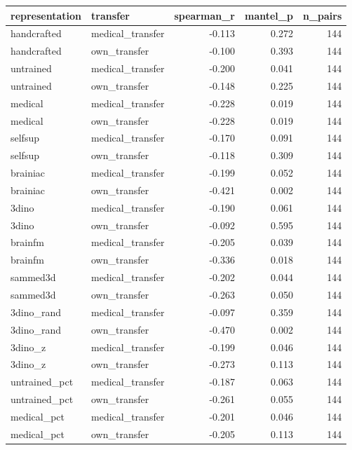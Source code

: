 \begin{tabular}{llrrr}
\toprule
representation & transfer & spearman\_r & mantel\_p & n\_pairs \\
\midrule
handcrafted & medical\_transfer & -0.113 & 0.272 & 144 \\
handcrafted & own\_transfer & -0.100 & 0.393 & 144 \\
untrained & medical\_transfer & -0.200 & 0.041 & 144 \\
untrained & own\_transfer & -0.148 & 0.225 & 144 \\
medical & medical\_transfer & -0.228 & 0.019 & 144 \\
medical & own\_transfer & -0.228 & 0.019 & 144 \\
selfsup & medical\_transfer & -0.170 & 0.091 & 144 \\
selfsup & own\_transfer & -0.118 & 0.309 & 144 \\
brainiac & medical\_transfer & -0.199 & 0.052 & 144 \\
brainiac & own\_transfer & -0.421 & 0.002 & 144 \\
3dino & medical\_transfer & -0.190 & 0.061 & 144 \\
3dino & own\_transfer & -0.092 & 0.595 & 144 \\
brainfm & medical\_transfer & -0.205 & 0.039 & 144 \\
brainfm & own\_transfer & -0.336 & 0.018 & 144 \\
sammed3d & medical\_transfer & -0.202 & 0.044 & 144 \\
sammed3d & own\_transfer & -0.263 & 0.050 & 144 \\
3dino\_rand & medical\_transfer & -0.097 & 0.359 & 144 \\
3dino\_rand & own\_transfer & -0.470 & 0.002 & 144 \\
3dino\_z & medical\_transfer & -0.199 & 0.046 & 144 \\
3dino\_z & own\_transfer & -0.273 & 0.113 & 144 \\
untrained\_pct & medical\_transfer & -0.187 & 0.063 & 144 \\
untrained\_pct & own\_transfer & -0.261 & 0.055 & 144 \\
medical\_pct & medical\_transfer & -0.201 & 0.046 & 144 \\
medical\_pct & own\_transfer & -0.205 & 0.113 & 144 \\
\bottomrule
\end{tabular}
